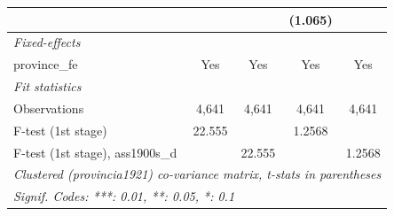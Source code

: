 \begin{table}[htbp]
\begin{tabular}{lcccc}
                                       &                       &                        & (1.065)                &   \\   
      \midrule
      \emph{Fixed-effects}\\
      province\_fe                     & Yes                   & Yes                    & Yes                    & Yes\\  
      \midrule
      \emph{Fit statistics}\\
      Observations                     & 4,641                 & 4,641                  & 4,641                  & 4,641\\  
      F-test (1st stage)               & 22.555                &                        & 1.2568                 & \\  
      F-test (1st stage), ass1900s\_d  &                       & 22.555                 &                        & 1.2568\\  
      \midrule \midrule
      \multicolumn{5}{l}{\emph{Clustered (provincia1921) co-variance matrix, t-stats in parentheses}}\\
      \multicolumn{5}{l}{\emph{Signif. Codes: ***: 0.01, **: 0.05, *: 0.1}}\\
   \end{tabular}
\end{table}



